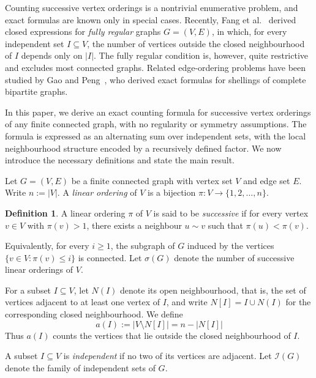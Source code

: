 \documentclass[11pt,a4paper]{article}
\numberwithin{equation}{section}
\theoremstyle{plain}
\theoremstyle{definition}
\newtheorem{definition}[theorem]{Definition}
\theoremstyle{remark}
\begin{document}
Counting successive vertex orderings is a nontrivial enumerative problem, and exact formulas are known only in special cases. Recently, Fang et al.~\cite{fang2023} derived closed expressions for \emph{fully regular}
graphs \(G=(V,E)\), in which, for every independent set \(I\subseteq V\), the number of vertices outside the closed neighbourhood of \(I\) depends only on \(|I|\). The fully regular condition is, however, quite restrictive and excludes most connected graphs. Related edge-ordering problems have been studied by Gao and Peng~\cite{gao2021counting}, who derived exact formulas for shellings of complete bipartite graphs. 

In this paper, we derive an exact counting formula for successive vertex orderings of any finite connected graph, with no regularity or symmetry assumptions. The formula is expressed as an alternating sum over independent sets, with the local neighbourhood structure encoded by a recursively defined factor.  
We now introduce the necessary definitions and state the main result.

Let \(G=(V,E)\) be a finite connected graph with vertex set \(V\) and edge set \(E\). Write \(n:=|V|\). A \emph{linear ordering} of \(V\) is a bijection 
\(
\pi:V\to\{1,2,\dots,n\}.
\)

\begin{definition}
A linear ordering \(\pi\) of \(V\) is said to be \emph{successive} if for every vertex \(v\in V\) with \(\pi(v)>1\), there exists a neighbour \(u\sim v\) such that \(\pi(u)<\pi(v)\).
\end{definition}

Equivalently, for every \(i\ge 1\), the subgraph of \(G\) induced by the vertices \(\{v\in V:\pi(v)\le i\}\) is connected. 
Let \(\sigma(G)\) denote the number of successive linear orderings of \(V\).

For a subset \(I\subseteq V\), let \(N(I)\) denote its open neighbourhood, that is, the set of vertices adjacent to at least one vertex of \(I\), and write
\(N[I]=I\cup N(I)\) for the corresponding closed neighbourhood.
We define
\begin{equation}\label{eq:def_a}
a(I) := |V\setminus N[I]| = n-|N[I]|
\end{equation}
Thus \(a(I)\) counts the vertices that lie outside the closed neighbourhood of \(I\).

A subset \(I\subseteq V\) is \emph{independent} if no two of its vertices are adjacent.
Let \(\mathcal I(G)\) denote the family of independent sets of \(G\).
\end{document}
